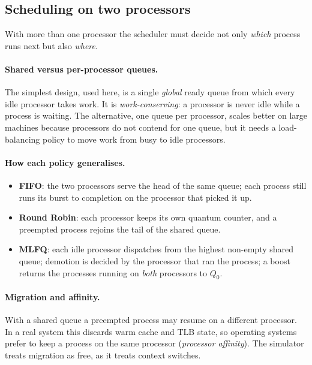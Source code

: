\documentclass[11pt,a4paper]{article}
\begin{document}
\subsection{Scheduling on two processors}\label{sec:multi}

With more than one processor the scheduler must decide not only \emph{which} process runs
next but also \emph{where}.

\paragraph{Shared versus per-processor queues.} The simplest design, used here, is a
single \emph{global} ready queue from which every idle processor takes work. It is
\emph{work-conserving}: a processor is never idle while a process is waiting. The
alternative, one queue per processor, scales better on large machines because processors
do not contend for one queue, but it needs a load-balancing policy to move work from busy
to idle processors.

\paragraph{How each policy generalises.}
\begin{itemize}\itemsep1pt
  \item \textbf{FIFO}: the two processors serve the head of the same queue; each process
        still runs its burst to completion on the processor that picked it up.
  \item \textbf{Round Robin}: each processor keeps its own quantum counter, and a preempted
        process rejoins the tail of the shared queue.
  \item \textbf{MLFQ}: each idle processor dispatches from the highest non-empty shared
        queue; demotion is decided by the processor that ran the process; a boost returns
        the processes running on \emph{both} processors to $Q_0$.
\end{itemize}

\paragraph{Migration and affinity.} With a shared queue a preempted process may resume on
a different processor. In a real system this discards warm cache and TLB state, so
operating systems prefer to keep a process on the same processor (\emph{processor
affinity}). The simulator treats migration as free, as it treats context switches.
\end{document}
